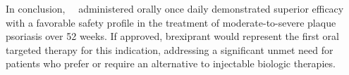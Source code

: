 \vspace{4pt}
In conclusion, \studydrug\ \studydose\ administered orally once daily demonstrated superior efficacy with a favorable safety profile in the treatment of moderate-to-severe plaque psoriasis over 52 weeks. If approved, brexiprant would represent the first oral targeted therapy for this indication, addressing a significant unmet need for patients who prefer or require an alternative to injectable biologic therapies.

\newpage

